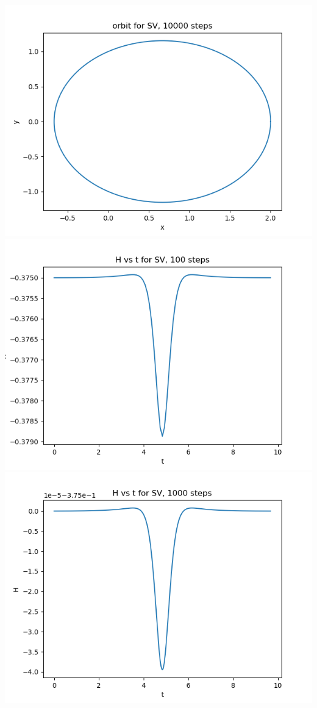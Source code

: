 \documentclass{article}
\begin{document}
\begin{enumerate}[label=(\alph*)]
\begin{center}
	\includegraphics[scale=.3]{hw5 SV orbit 10000 steps}
	\includegraphics[scale=.3]{hw5 SV ham 100 steps}
	\includegraphics[scale=.3]{hw5 SV ham 1000 steps}

\end{center}
\end{enumerate}
\end{document}
